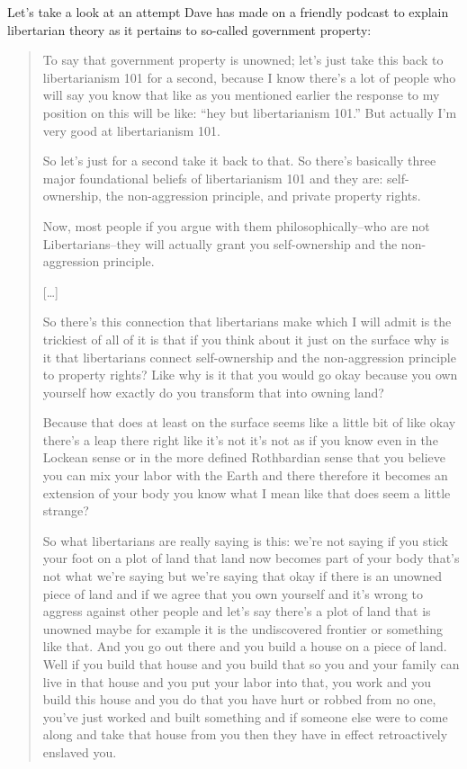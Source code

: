 \documentclass[11pt]{article}
\begin{document}
Let's take a look at an attempt Dave has made on a friendly podcast to explain libertarian theory as it pertains to so-called government property:
\begin{quote}
To say that government property is unowned; let's just take this back to libertarianism 101 for a second, because I know there's a lot of people who will say you know that like as you mentioned earlier the response to my position on this will be like: ``hey but libertarianism 101.'' But actually I'm very good at libertarianism 101.

So let's just for a second take it back to that. So there's basically three major foundational beliefs of libertarianism 101 and they are: self- ownership, the non-aggression principle, and private property rights.

Now, most people if you argue with them philosophically--who are not Libertarians--they will actually grant you self-ownership and the non-aggression principle.

{[}\ldots{}]

So there's this connection that libertarians make which I will admit is the trickiest of all of it is that if you think about it just on the surface why is it that libertarians connect self-ownership and the non-aggression principle to property rights? Like why is it that you would go okay because you own yourself how exactly do you transform that into owning land?

Because that does at least on the surface seems like a little bit of like okay there's a leap there right like it's not it's not as if you know even in the Lockean sense or in the more defined Rothbardian sense that you believe you can mix your labor with the Earth and there therefore it becomes an extension of your body you know what I mean like that does seem a little strange?

So what libertarians are really saying is this: we're not saying if you stick your foot on a plot of land that land now becomes part of your body that's not what we're saying but we're saying that okay if there is an unowned piece of land and if we agree that you own yourself and it's wrong to aggress against other people and let's say there's a plot of land that is unowned maybe for example it is the undiscovered frontier or something like that. And you go out there and you build a house on a piece of land. Well if you build that house and you build that so you and your family can live in that house and you put your labor into that, you work and you build this house and you do that you have hurt or robbed from no one, you've just worked and built something and if someone else were to come along and take that house from you then they have in effect retroactively enslaved you.


\end{quote}
\end{document}
